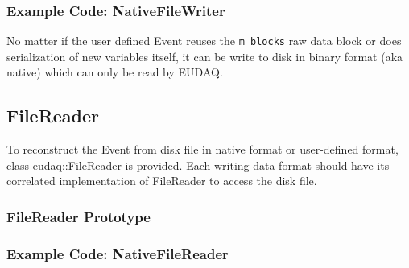 \subsubsection{Example Code: NativeFileWriter}
No matter if the user defined Event reuses the \lstinline[style=cpp]{m_blocks} raw data block or does serialization of new variables itself, it can be write to disk in binary format (aka native) which can only be read by EUDAQ.



\subsection{FileReader}\label{sec:FileReaderWriting}
To reconstruct the Event from disk file in native format or user-defined format, class eudaq::FileReader is provided. Each writing data format should have its correlated implementation of FileReader to access the disk file.

\subsubsection{FileReader Prototype}


\subsubsection{Example Code: NativeFileReader}

